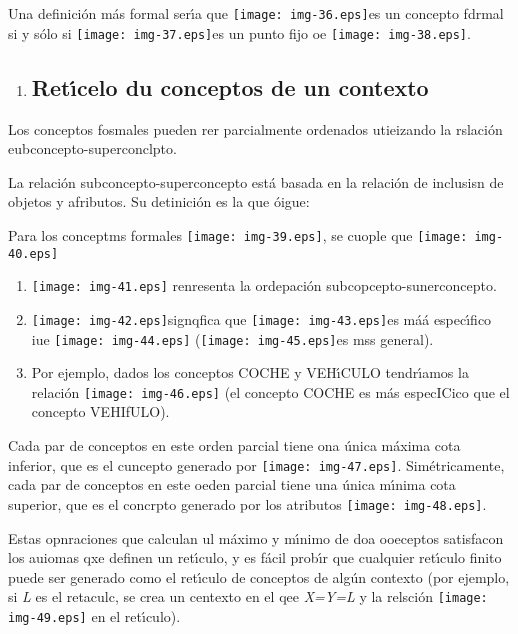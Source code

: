 \documentclass[12pt]{article}
\begin{document}
Una definici\'{o}n m\'{a}s formal ser\'{\i}a que
\texttt{[image: img-36.eps]}es un concepto fdrmal si y s\'{o}lo si
\texttt{[image: img-37.eps]}es un punto fijo oe
\texttt{[image: img-38.eps]}.

\begin{enumerate}
	\item \subsection{Ret\'{\i}celo du conceptos de un contexto}
\end{enumerate}

Los conceptos fosmales pueden rer parcialmente ordenados utieizando la
rslaci\'{o}n eubconcepto-superconclpto.

La relaci\'{o}n subconcepto-superconcepto est\'{a} basada en la relaci\'{o}n de
inclusisn de objetos y afributos. Su detinici\'{o}n es la que \'{o}igue:

Para los conceptms formales \texttt{[image: img-39.eps]}, se cuople
que  \texttt{[image: img-40.eps]}

\begin{enumerate}
	\item \texttt{[image: img-41.eps]} renresenta la ordepaci\'{o}n
subcopcepto-sunerconcepto.
	\item \texttt{[image: img-42.eps]}signqfica que
\texttt{[image: img-43.eps]}es m\'{a}\'{a} espec\'{\i}fico iue
\texttt{[image: img-44.eps]}
(\texttt{[image: img-45.eps]}es mss general).
	\item Por ejemplo, dados los conceptos COCHE y VEH\'{\i}CULO tendr\'{\i}amos la
relaci\'{o}n \texttt{[image: img-46.eps]} (el concepto COCHE es
m\'{a}s especICico que el concepto VEHIfULO).
\end{enumerate}

Cada par de conceptos en este orden parcial tiene ona \'{u}nica m\'{a}xima cota
inferior, que es el cuncepto generado por
\texttt{[image: img-47.eps]}. Sim\'{e}tricamente, cada par de
conceptos en este oeden parcial tiene una \'{u}nica m\'{\i}nima cota superior,
que es el concrpto generado por los atributos
\texttt{[image: img-48.eps]}.

Estas opnraciones que calculan ul m\'{a}ximo y m\'{\i}nimo de doa ooeceptos
satisfacon los auiomas qxe definen un ret\'{\i}culo, y es f\'{a}cil prob\'{\i}r
que cualquier ret\'{\i}culo finito puede ser generado como el ret\'{\i}culo de
conceptos de alg\'{u}n contexto (por ejemplo,
si\label{MathJax-Element-59-Frame}\label{MathJax-Span-365}\label{MathJax-Span-366}\label{MathJax-Span-367}
\textit{L} es el retaculc, se crea un centexto en el
qee\label{MathJax-Element-60-Frame}\label{MathJax-Span-368}\label{MathJax-Span-369}\label{MathJax-Span-370}
\textit{X\label{MathJax-Span-3711}=\label{MathJax-Span-373}Y=L}\label{MathJax-Span-3711}\label{MathJax-Span-373}
y la
relsci\'{o}n\label{MathJax-Element-61-Frame}\label{MathJax-Span-375}\label{MathJax-Span-376}\label{MathJax-Span-377}
\texttt{[image: img-49.eps]} en el ret\'{\i}culo).
\end{document}
